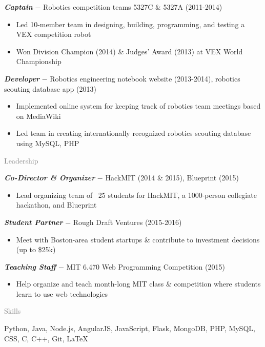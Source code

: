 \documentclass[11pt]{article}
\newcommand{\rsection}[1]{\vspace{1em}\textcolor{gray}{\Large \robotoslab #1}\vspace{0.5em}}
\newcommand{\bt}[1]{\textit{\textbf{#1}}} %
\newcommand{\gap}[0]{\vspace{0.5em}} %
\newcommand{\dash}[0]{ $-$ } %
\begin{document}
\bt{Captain}\dash Robotics competition teams 5327C \& 5327A (2011-2014)

\begin{itemize}
\item Led 10-member team in designing, building, programming, and testing a VEX competition robot
\item Won Division Champion (2014) \& Judges' Award (2013) at VEX World Championship
\end{itemize}

\gap

\bt{Developer}\dash Robotics engineering notebook website (2013-2014), robotics scouting database app (2013)

\begin{itemize}
\item Implemented online system for keeping track of robotics team meetings based on MediaWiki
\item Led team in creating internationally recognized robotics scouting database using MySQL, PHP
\end{itemize}

\rsection{Leadership}

\bt{Co-Director \& Organizer}\dash HackMIT (2014 \& 2015), Blueprint (2015)

\begin{itemize}
\item Lead organizing team of ~25 students for HackMIT, a 1000-person collegiate hackathon, and Blueprint
\end{itemize}

\gap

\bt{Student Partner}\dash Rough Draft Ventures (2015-2016)

\begin{itemize}
\item Meet with Boston-area student startups \& contribute to investment decisions (up to \$25k)
\end{itemize}

\gap

\bt{Teaching Staff}\dash MIT 6.470 Web Programming Competition (2015)

\begin{itemize}
\item Help organize and teach month-long MIT class \& competition where students learn to use web technologies
\end{itemize}

\rsection{Skills}

Python, Java, Node.js, AngularJS, JavaScript, Flask, MongoDB, PHP, MySQL, CSS, C, C++, Git, LaTeX
\end{document}
